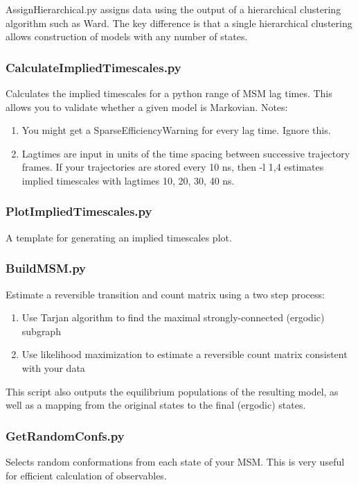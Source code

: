 \documentclass[12pt]{article}
\begin{document}
AssignHierarchical.py assigns data using the output of a hierarchical clustering algorithm such as Ward.  The key difference is that a single hierarchical clustering allows construction of models with any number of states.

\subsubsection{CalculateImpliedTimescales.py}
Calculates the implied timescales for a python range of MSM lag times.  This allows you to validate whether a given model is Markovian.  
	Notes:
\begin{enumerate}
 \item You might get a SparseEfficiencyWarning for every lag time. Ignore this.
 \item Lagtimes are input in units of the time spacing between successive trajectory frames.  If your trajectories are stored every 10 ns, then -l 1,4 estimates implied timescales with lagtimes 10, 20, 30, 40 ns.  
\end{enumerate}

\subsubsection{PlotImpliedTimescales.py}
A template for generating an implied timescales plot.

\subsubsection{BuildMSM.py}
Estimate a reversible transition and count matrix using a two step process:
\begin{enumerate}
 \item Use Tarjan algorithm to find the maximal strongly-connected (ergodic) subgraph
 \item Use likelihood maximization to estimate a reversible count matrix consistent with your data
\end{enumerate}

This script also outputs the equilibrium populations of the resulting model, as well as a mapping from the original states to the final (ergodic) states.

\subsubsection{GetRandomConfs.py}
Selects random conformations from each state of your MSM. This is very useful for efficient calculation of observables.
\end{document}

